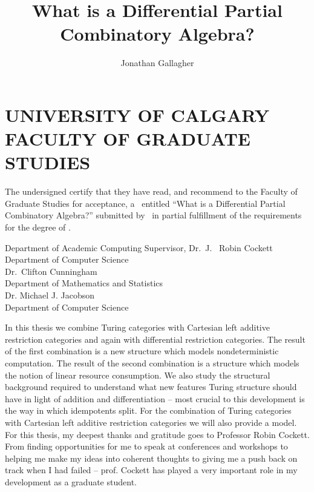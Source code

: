 \documentclass{ucalgthes1}
\title{What is a Differential Partial Combinatory Algebra?}
\author{Jonathan Gallagher}
\newcommand{\thesistitle}{What is a Differential Partial Combinatory Algebra?}
\begin{document}
\makethesistitle
{}     %
\setcounter{page}{1}
\chapter*{UNIVERSITY OF CALGARY \\ FACULTY OF GRADUATE STUDIES}
\thispagestyle{empty}
The undersigned certify that they have read, and recommend
to the Faculty of Graduate Studies for acceptance, a \Thesis\ entitled
``\thesistitle'' submitted by \Author\
in partial fulfillment of the requirements for the degree of
\Degree.\\

%
%
\begin{signing}{Department of Academic Computing}
\signline
Supervisor, Dr.~J.~ Robin Cockett \\
Department of Computer Science\\
\signline
Dr.~Clifton Cunningham \\
Department of Mathematics and Statistics\\
\signline
Dr. Michael J. Jacobson \\
Department of Computer Science\\
\end{signing}
\newpage
{}
{} 
In this thesis we combine Turing categories with Cartesian left additive restriction categories and again with differential restriction categories.  The result of the first combination is a new structure which models nondeterministic computation.  The result of the second combination is a structure which models the notion of linear resource consumption.  We also study the structural background required to understand what new features Turing structure should have in light of addition and differentiation -- most crucial to this development is the way in which idempotents split.  For the combination of Turing categories with Cartesian left additive restriction categories we will also provide a model.
\newpage
{}
{}
For this thesis, my deepest thanks and gratitude goes to Professor Robin Cockett.  From finding opportunities for me to speak at conferences and workshops to helping me make my ideas into coherent thoughts to giving me a push back on track when I had failed -- prof. Cockett has played a very important role in my development as a graduate student.
\end{document}
